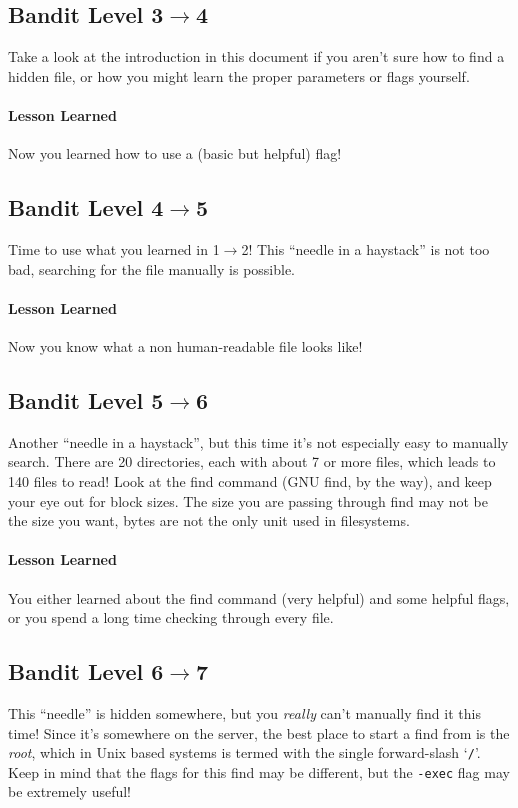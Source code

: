 \documentclass[12pt]{article}
\begin{document}
\subsection{Bandit Level 3$\to$4}
Take a look at the introduction in this document if you aren't sure how to find a hidden file, or how you might learn the proper parameters or flags yourself.

\paragraph{Lesson Learned}
Now you learned how to use a (basic but helpful) flag!

\subsection{Bandit Level 4$\to$5}
Time to use what you learned in 1$\to$2!
This ``needle in a haystack'' is not too bad, searching for the file manually is possible.
\paragraph{Lesson Learned}
Now you know what a non human-readable file looks like!

\subsection{Bandit Level 5$\to$6}
Another ``needle in a haystack'', but this time it's not especially easy to manually search.
There are 20 directories, each with about 7 or more files, which leads to 140 files to read!
Look at the find command (GNU find, by the way), and keep your eye out for block sizes.
The size you are passing through find may not be the size you want, bytes are not the only unit used in filesystems.

\paragraph{Lesson Learned}
You either learned about the find command (very helpful) and some helpful flags, or you spend a long time checking through every file.

\subsection{Bandit Level 6$\to$7}
This ``needle'' is hidden somewhere, but you \emph{really} can't manually find it this time!
Since it's somewhere on the server, the best place to start a find from is the \emph{root}, which in Unix based systems is termed with the single forward-slash `\verb|/|'.
Keep in mind that the flags for this find may be different, but the \verb|-exec| flag may be extremely useful!
\end{document}
